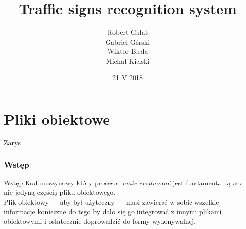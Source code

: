  \usepackage{adjustbox}

\title{Traffic signs recognition system}
\author{Robert Gałat\\Gabriel Górski\\Wiktor Bieda\\Michał Kielski}
\date{21 V 2018} 




\maketitle
\part{Pliki obiektowe}
\begin{frame}{Zarys}
  \tableofcontents
\end{frame}
\section{Wstęp}
\begin{frame}{Wstęp}
  Kod maszynowy który procesor \textit{umie ewaluować} jest fundamentalną acz
  nie jedyną częścią pliku obiektowego.\\

  Plik obiektowy --- aby był użyteczny --- musi zawierać w sobie wszelkie
  informacje konieczne do tego by dało się go integrować z innymi plikami
  obiektowymi i ostatecznie doprowadzić do formy wykonywalnej.
\end{frame}
